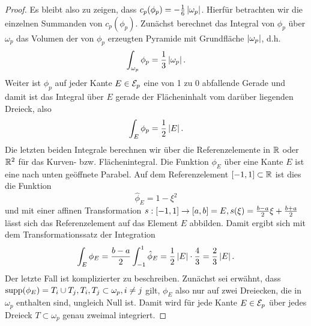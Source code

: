 \begin{itemize}
\begin{proof}
Es bleibt also zu zeigen, dass $c_p(\phi_p) = -\frac 1 6 \, \lvert \omega_p\rvert$. Hierfür betrachten wir die einzelnen Summanden von $c_p(\phi_p)$. Zunächst berechnet das Integral von $\phi_p$ über $\omega_p$ das Volumen der von $\phi_p$ erzeugten Pyramide mit Grundfläche $\lvert \omega_p\rvert$, d.h.
\begin{align}\label{eq:4.35}
	\int_{\omega_p} \phi_p = \frac 13 \, \lvert \omega_p\rvert \, .
\end{align}
Weiter ist $\phi_p$ auf jeder Kante $E \in \mathcal E_p$ eine von 1 zu 0 abfallende Gerade und damit ist das Integral über $E$ gerade der Flächeninhalt vom darüber liegenden Dreieck, also
\begin{align}\label{eq:4.36}
	\int_E \phi_p = \frac 1 2 \, \lvert E\rvert \, .
\end{align}
Die letzten beiden Integrale berechnen wir über die Referenzelemente in $\mathbb{R}$ oder $\mathbb{R}^2$ für das Kurven- bzw. Flächenintegral. Die Funktion $\phi_E$ über eine Kante $E$ ist eine nach unten geöffnete Parabel. Auf dem Referenzelement $[-1,1]\subset\mathbb{R}$ ist dies die Funktion
\[
	\hat \phi_E = 1-\xi^2 
\]
und mit einer affinen Transformation $s: [-1,1]\rightarrow [a,b] = E, s(\xi) = \frac{b-a}2 \xi + \frac{b+a}2$ lässt sich das Referenzelement auf das Element $E$ abbilden. Damit ergibt sich mit dem Transformationssatz der Integration
\begin{align}\label{eq:4.37}
	\int_E \phi_E = \frac{b-a}2 \int_{-1}^1 \hat\phi_E = \frac 12 \, \lvert E\rvert \cdot \frac 43 = \frac 23 \, \lvert E\rvert\, .
\end{align}
Der letzte Fall ist komplizierter zu beschreiben. Zunächst sei erwähnt, dass $\operatorname{supp} (\phi_E) = T_i \cup T_j, T_i,T_j \subset \omega_p, i\not=j$ gilt, $\phi_E$ also nur auf zwei Dreiecken, die in $\omega_p$ enthalten sind, ungleich Null ist. Damit wird für jede Kante $E \in \mathcal E_p$ über jedes Dreieck $T \subset \omega_p$ genau zweimal integriert.


\end{proof}
\end{itemize}
